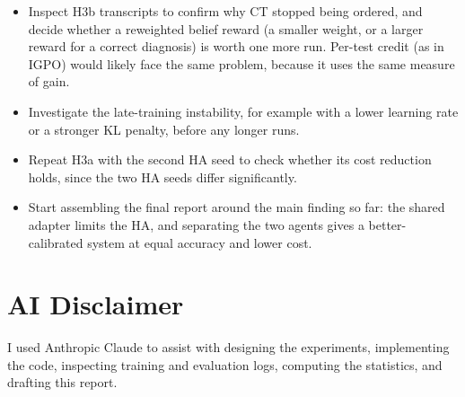 \documentclass[11pt]{article}
\begin{document}
\begin{itemize}
  \item Inspect H3b transcripts to confirm why CT stopped being ordered, and
        decide whether a reweighted belief reward (a smaller weight, or a larger
        reward for a correct diagnosis) is worth one more run. Per-test credit
        (as in IGPO) would likely face the same problem, because it uses the same
        measure of gain.
  \item Investigate the late-training instability, for example with a lower
        learning rate or a stronger KL penalty, before any longer runs.
  \item Repeat H3a with the second HA seed to check whether its cost reduction
        holds, since the two HA seeds differ significantly.
  \item Start assembling the final report around the main finding so far: the
        shared adapter limits the HA, and separating the two agents gives a
        better-calibrated system at equal accuracy and lower cost.
\end{itemize}

\section{AI Disclaimer}

I used Anthropic Claude to assist with designing the experiments, implementing
the code, inspecting training and evaluation logs, computing the statistics,
and drafting this report.
\end{document}
